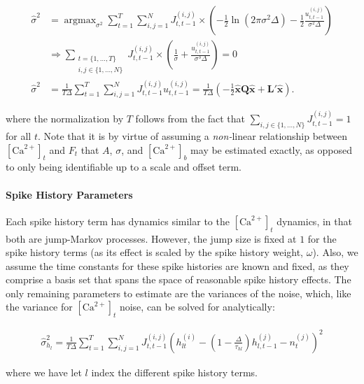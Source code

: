 \documentclass[12pt]{article}
\providecommand{\ve}[1]{\boldsymbol{#1}}
\providecommand{\ve}[1]{\boldsymbol{#1}}
\DeclareMathOperator*{\argmax}{argmax}
\newcommand{\Ca}{[\text{Ca}^{2+}]}
\begin{document}
\begin{subequations}
\begin{align}
\widehat{\sigma}^2 &= \argmax_{\sigma^2} \sum_{t=1}^T \sum_{i,j=1}^N J^{(i,j)}_{t,t-1} \times \left( -\frac{1}{2} \ln (2 \pi \sigma^2 \Delta) - \frac{1}{2} \frac{u_{t,t-1}^{(i,j)}}{\sigma^2 \Delta}\right)
\\ &\Rightarrow \sum_{\substack{t=\{1,\ldots,T\} \\ i,j \in \{1,\ldots,N\}}} J^{(i,j)}_{t,t-1} \times \left( \frac{1}{\sigma} + \frac{u_{t,t-1}^{(i,j)}}{\sigma^3 \Delta}\right) = 0
\\ \widehat{\sigma}^2 &= \frac{1}{T \Delta}\sum_{t=1}^T \sum_{i,j=1}^N J^{(i,j)}_{t,t-1} u_{t,t-1}^{(i,j)}= \frac{1}{T \Delta} \left(-\frac{1}{2}\widehat{\ve{x}} \ve{Q} \widehat{\ve{x}} + \ve{L}' \widehat{\ve{x}}\right). \label{eq:sig}
\end{align}
\end{subequations}

\noindent where the normalization by $T$ follows from the fact that $\sum_{i,j \in \{1,\ldots,N\}} J^{(i,j)}_{t,t-1}=1$ for all  $t$. Note that it is by virtue of assuming a \emph{non-}linear relationship between $\Ca_t$ and $F_t$ that $A$, $\sigma$, and $\Ca_b$ may be estimated exactly, as opposed to only being identifiable up to a scale and offset term.

\paragraph{Spike History Parameters}

Each spike history term has dynamics similar to the $\Ca_t$ dynamics, in that both are jump-Markov processes.  However, the jump size is fixed at $1$ for the spike history terms (as its effect is scaled by the spike history weight, $\omega$). Also, we assume the time constants for these spike histories are known and fixed, as they comprise a basis set that spans the space of reasonable spike history effects.  The only remaining parameters to estimate are the variances of the noise, which, like the variance for $\Ca_t$ noise, can be solved for analytically:

\begin{align}
\widehat{\sigma}_{h_l}^2 = \frac{1}{T \Delta} \sum_{t=1}^T \sum_{i,j=1}^N J^{(i,j)}_{t,t-1} \left(h_{lt}^{(i)} - (1 - \frac{\Delta}{\tau_{hl}}) h_{l,t-1}^{(j)} -  n_t^{(j)}\right)^2
\end{align}

\noindent where we have let $l$ index the different spike history terms.
\end{document}
